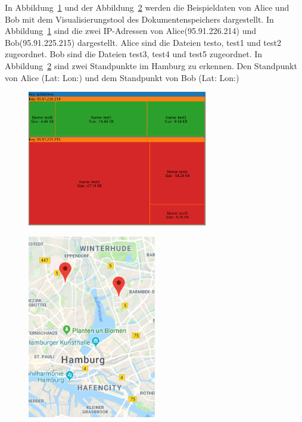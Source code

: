 \documentclass[
    fontsize=12pt,
    headings=small,
    parskip=half,           %
    bibliography=totoc,
    numbers=noenddot,       %
    open=any,               %
    ]{scrreprt}
\begin{document}
In Abbildung~\ref{fig:ungIpTM} und der Abbildung~\ref{fig:ungIpM} werden die Beispieldaten von Alice und Bob mit dem Visualisierungstool des Dokumentenspeichers dargestellt.
In Abbildung~\ref{fig:ungIpTM} sind die zwei IP-Adressen von Alice(95.91.226.214) und Bob(95.91.225.215) dargestellt.
Alice sind die Dateien testo, test1 und test2 zugeordnet.
Bob sind die Dateien test3, test4 und test5 zugeordnet. 
In Abbildung~\ref{fig:ungIpM} sind zwei Standpunkte im Hamburg zu erkennen.
Den Standpunkt von Alice (Lat: Lon:) und dem Standpunkt von Bob (Lat: Lon:)

\begin{figure}[H]
\includegraphics[width=0.7\textwidth]{../pic/IP-Proxy-SetA-tree2.PNG}
\label{fig:ungIpTM}
\end{figure}

\begin{figure}[H]
\includegraphics[width=0.5\textwidth , height=0.4\textheight]{../pic/IP-Proxy-SetA.PNG}
\label{fig:ungIpM}
\end{figure}
\end{document}
